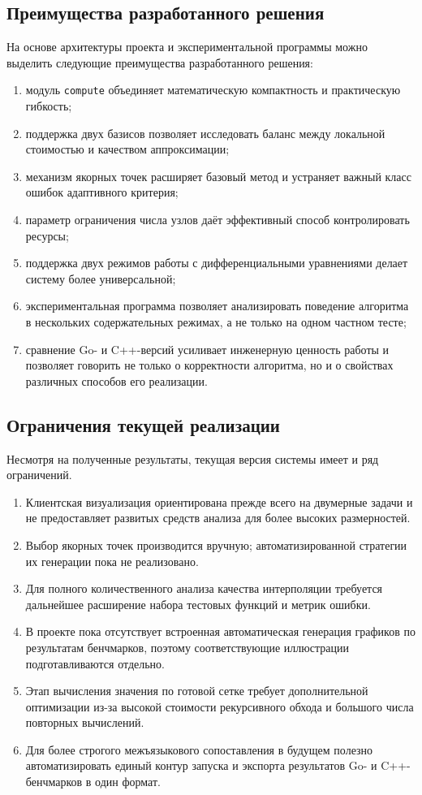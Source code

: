 \subsection{Преимущества разработанного решения}

На основе архитектуры проекта и экспериментальной программы можно выделить следующие преимущества разработанного решения:
\begin{enumerate}
    \item модуль \texttt{compute} объединяет математическую компактность и практическую гибкость;
    \item поддержка двух базисов позволяет исследовать баланс между локальной стоимостью и качеством аппроксимации;
    \item механизм якорных точек расширяет базовый метод и устраняет важный класс ошибок адаптивного критерия;
    \item параметр ограничения числа узлов даёт эффективный способ контролировать ресурсы;
    \item поддержка двух режимов работы с дифференциальными уравнениями делает систему более универсальной;
    \item экспериментальная программа позволяет анализировать поведение алгоритма в нескольких содержательных режимах, а не только на одном частном тесте;
    \item сравнение Go- и C++-версий усиливает инженерную ценность работы и позволяет говорить не только о корректности алгоритма, но и о свойствах различных способов его реализации.
\end{enumerate}

\subsection{Ограничения текущей реализации}

Несмотря на полученные результаты, текущая версия системы имеет и ряд ограничений.

\begin{enumerate}
    \item Клиентская визуализация ориентирована прежде всего на двумерные задачи и не предоставляет развитых средств анализа для более высоких размерностей.
    \item Выбор якорных точек производится вручную; автоматизированной стратегии их генерации пока не реализовано.
    \item Для полного количественного анализа качества интерполяции требуется дальнейшее расширение набора тестовых функций и метрик ошибки.
    \item В проекте пока отсутствует встроенная автоматическая генерация графиков по результатам бенчмарков, поэтому соответствующие иллюстрации подготавливаются отдельно.
    \item Этап вычисления значения по готовой сетке требует дополнительной оптимизации из-за высокой стоимости рекурсивного обхода и большого числа повторных вычислений.
    \item Для более строгого межъязыкового сопоставления в будущем полезно автоматизировать единый контур запуска и экспорта результатов Go- и C++-бенчмарков в один формат.
\end{enumerate}

